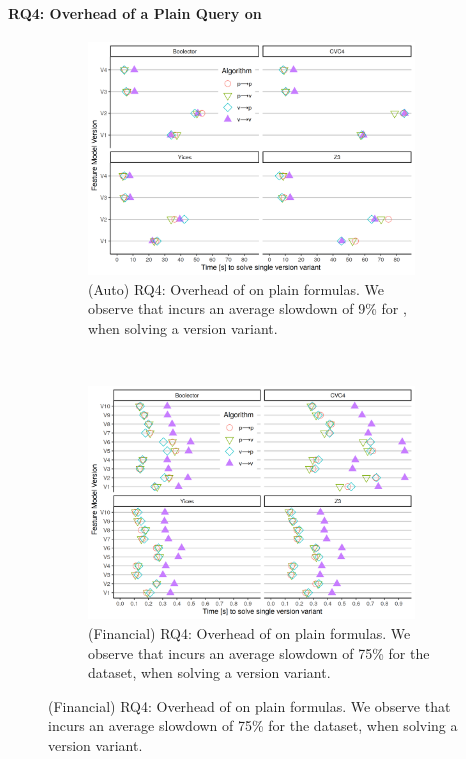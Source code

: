 \paragraph{RQ4: Overhead of a Plain Query on \vsat{}}
%
\begin{figure}
  \begin{subfigure}[t]{\textwidth}
    \centering
    \includegraphics[width=0.95\textwidth]{Plots/RQ4_Auto}
    \caption{(Auto) RQ4: Overhead of \vTov{} on plain formulas. We observe that
      \vTov{} incurs an average slowdown of 9\% for \auto{}, when
      solving a version variant.}%
    \label{res:overhead:auto}
  \end{subfigure}
~
  \begin{subfigure}[t]{\textwidth}
    \centering
    \includegraphics[width=0.95\textwidth]{Plots/RQ4_Fin}
    \caption{(Financial) RQ4: Overhead of \vTov{} on plain formulas. We observe
      that \vTov{} incurs an average slowdown of 75\% for the \fin{}
      dataset, when solving a version variant.}%
    \label{res:overhead:fin}
  \end{subfigure}
\end{figure}
